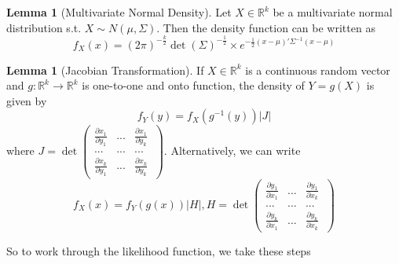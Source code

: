 \documentclass[12pt]{article}
\theoremstyle{definition}
\theoremstyle{property}
\theoremstyle{assumption}
\theoremstyle{example}
\theoremstyle{comment}
\newtheorem{lemma}[theorem]{Lemma}
\begin{document}
\begin{mdframed}[backgroundcolor=blue!5] 
\begin{lemma}[Multivariate Normal Density]
Let $X\in\mathbb{R}^k$ be a multivariate normal distribution s.t. $X\sim N(\mu, \Sigma)$. Then the density function can be written as
\[
f_X(x)=(2\pi)^{-\frac{k}{2}}\det(\Sigma)^{-\frac{1}{2}}\times e^{-\frac{1}{2}(x-\mu)'\Sigma^{-1}(x-\mu)}
\]
\end{lemma}
\begin{lemma}[Jacobian Transformation]
If $X\in\mathbb{R}^k$ is a continuous random vector and $g:\mathbb{R}^k \to\mathbb{R}^k$ is one-to-one and onto function, the density of $Y=g(X)$ is given by
\[
f_Y(y) = f_X(g^{-1}(y))\left|J\right|
\]
where $J = \det\begin{pmatrix}\frac{\partial x_1}{\partial y_1} & ... & \frac{\partial x_1}{\partial y_k} \
\\ ... &... &...\\ \frac{\partial x_k}{\partial y_1} & ... &\frac{\partial x_k}{\partial y_k}\end{pmatrix}$. Alternatively, we can write
\[
f_X(x) = f_Y(g(x))|H|, H=\det\begin{pmatrix}\frac{\partial y_1}{\partial x_1} & ... & \frac{\partial y_1}{\partial x_k} \
\\ ... &... &...\\ \frac{\partial y_k}{\partial x_1} & ... &\frac{\partial y_k}{\partial x_k}\end{pmatrix}
\]
\end{lemma}
\end{mdframed}
So to work through the likelihood function, we take these steps
\end{document}
